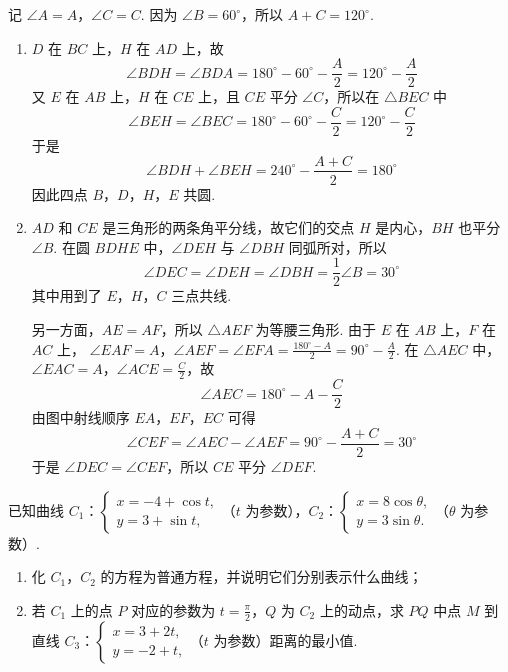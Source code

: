 \begin{solution}
记 \(\angle A=A\)，\(\angle C=C\). 因为 \(\angle B=60^{\circ}\)，所以 \(A+C=120^{\circ}\).

\begin{enumerate}
\item \(D\) 在 \(BC\) 上，\(H\) 在 \(AD\) 上，故
\[
\angle BDH=\angle BDA=180^{\circ}-60^{\circ}-\frac{A}{2}=120^{\circ}-\frac{A}{2}
\]
又 \(E\) 在 \(AB\) 上，\(H\) 在 \(CE\) 上，且 \(CE\) 平分 \(\angle C\)，所以在 \(\triangle BEC\) 中
\[
\angle BEH=\angle BEC=180^{\circ}-60^{\circ}-\frac{C}{2}=120^{\circ}-\frac{C}{2}
\]
于是
\[
\angle BDH+\angle BEH=240^{\circ}-\frac{A+C}{2}=180^{\circ}
\]
因此四点 \(B\)，\(D\)，\(H\)，\(E\) 共圆.

\item \(AD\) 和 \(CE\) 是三角形的两条角平分线，故它们的交点 \(H\) 是内心，\(BH\) 也平分 \(\angle B\). 在圆 \(BDHE\) 中，\(\angle DEH\) 与 \(\angle DBH\) 同弧所对，所以
\[
\angle DEC=\angle DEH=\angle DBH=\frac12\angle B=30^{\circ}
\]
其中用到了 \(E\)，\(H\)，\(C\) 三点共线.

另一方面，\(AE=AF\)，所以 \(\triangle AEF\) 为等腰三角形. 由于 \(E\) 在 \(AB\) 上，\(F\) 在 \(AC\) 上，
\(\angle EAF=A\)，\(\angle AEF=\angle EFA=\frac{180^{\circ}-A}{2}=90^{\circ}-\frac{A}{2}\).
在 \(\triangle AEC\) 中，\(\angle EAC=A\)，\(\angle ACE=\frac{C}{2}\)，故
\[
\angle AEC=180^{\circ}-A-\frac{C}{2}
\]
由图中射线顺序 \(EA\)，\(EF\)，\(EC\) 可得
\[
\angle CEF=\angle AEC-\angle AEF=90^{\circ}-\frac{A+C}{2}=30^{\circ}
\]
于是 \(\angle DEC=\angle CEF\)，所以 \(CE\) 平分 \(\angle DEF\).
\end{enumerate}
\end{solution}

\FloatBarrier

\begin{problem}
已知曲线 \(C_1\)：\(\begin{cases}
x = -4 + \cos t,\\
y = 3 + \sin t,
\end{cases}\)（\(t\) 为参数），\(C_2\)：\(\begin{cases}
x = 8\cos \theta,\\
y = 3\sin \theta.
\end{cases}\)（\(\theta\) 为参数）.

\begin{enumerate}
\item 化 \(C_1\)，\(C_2\) 的方程为普通方程，并说明它们分别表示什么曲线；
\item 若 \(C_1\) 上的点 \(P\) 对应的参数为 \(t = \frac{\pi}{2}\)，\(Q\) 为 \(C_2\) 上的动点，求 \(PQ\) 中点 \(M\) 到直线 \(C_3\)：\(\begin{cases}
x = 3 + 2t,\\
y = -2 + t,
\end{cases}\)（\(t\) 为参数）距离的最小值.
\end{enumerate}
\end{problem}

